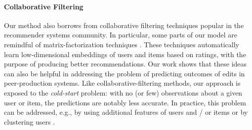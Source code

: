 \paragraph{Collaborative Filtering}
Our method also borrows from collaborative filtering techniques popular in the recommender systems community.
In particular, some parts of our model are remindful of matrix-factorization techniques \citep{koren2009matrix}.
These techniques automatically learn low-dimensional embeddings of users and items based on ratings, with the purpose of producing better recommendations.
Our work shows that these ideas can also be helpful in addressing the problem of predicting outcomes of edits in peer-production systems.
Like collaborative-filtering methods, our approach is exposed to the \emph{cold-start} problem:
with no (or few) observations about a given user or item, the predictions are notably less accurate.
In practice, this problem can be addressed, e.g., by using additional features of users and / or items \citep{schein2002methods, lam2008addressing} or by clustering users \citep{levi2012finding}.
